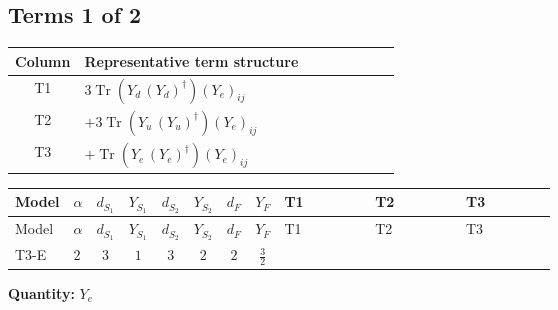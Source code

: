 \documentclass[8pt]{article}
\begin{document}
\begin{landscape}
\subsection*{Terms 1 of 2}
\begin{center}
\begin{tabular}{@{}c >{\raggedright\arraybackslash}p{0.82\linewidth}@{}}
\toprule
Column & Representative term structure \\
\midrule
T1 & \(\displaystyle 3 \operatorname{Tr}\!\left({Y_d}\,\left({Y_d}\right)^{\dagger}\right) \left({Y_e}\right)_{ij}\) \\
\midrule
T2 & \(\displaystyle +3 \operatorname{Tr}\!\left({Y_u}\,\left({Y_u}\right)^{\dagger}\right) \left({Y_e}\right)_{ij}\) \\
\midrule
T3 & \(\displaystyle +\operatorname{Tr}\!\left({Y_e}\,\left({Y_e}\right)^{\dagger}\right) \left({Y_e}\right)_{ij}\) \\
\midrule
\bottomrule
\end{tabular}
\end{center}
\smallskip
\tiny
\begin{longtable}{@{}llcccccc >{\raggedright\arraybackslash}p{0.21\linewidth} >{\raggedright\arraybackslash}p{0.21\linewidth} >{\raggedright\arraybackslash}p{0.21\linewidth}@{}}
\toprule
Model & $\alpha$ & $d_{S_1}$ & $Y_{S_1}$ & $d_{S_2}$ & $Y_{S_2}$ & $d_F$ & $Y_F$ & T1 & T2 & T3 \\
\midrule
\endfirsthead
\toprule
Model & $\alpha$ & $d_{S_1}$ & $Y_{S_1}$ & $d_{S_2}$ & $Y_{S_2}$ & $d_F$ & $Y_F$ & T1 & T2 & T3 \\
\midrule
\endhead
T3-E & $2$ & $3$ & $1$ & $3$ & $2$ & $2$ & $\frac{3}{2}$ & \scriptsize\adjustbox{max width=\linewidth}{$\begin{gathered} 3 \operatorname{Tr}\!\left({Y_d}\,\left({Y_d}\right)^{\dagger}\right) \left({Y_e}\right)_{ij}\end{gathered}$} & \scriptsize\adjustbox{max width=\linewidth}{$\begin{gathered} +3 \operatorname{Tr}\!\left({Y_u}\,\left({Y_u}\right)^{\dagger}\right) \left({Y_e}\right)_{ij}\end{gathered}$} & \scriptsize\adjustbox{max width=\linewidth}{$\begin{gathered} +\operatorname{Tr}\!\left({Y_e}\,\left({Y_e}\right)^{\dagger}\right) \left({Y_e}\right)_{ij}\end{gathered}$} \\
\midrule
\bottomrule
\end{longtable}
\clearpage
\noindent\textbf{Quantity: }$Y_e$\par\smallskip

\end{landscape}
\end{document}
